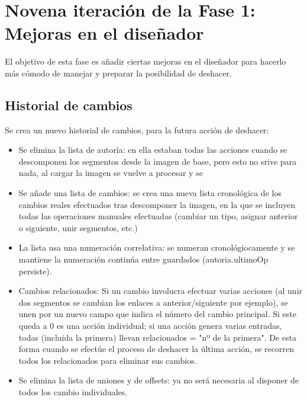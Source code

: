 	\section{Novena iteración de la Fase 1: Mejoras en el diseñador}
\label{sec:MejorasDiseñador}

El objetivo de esta fase es añadir ciertas mejoras en el diseñador para hacerlo más cómodo de manejar y preparar la posibilidad de deshacer.

\subsection{Historial de cambios}

Se crea un nuevo historial de cambios, para la futura acción de deshacer:
\begin{itemize}
	\item Se elimina la lista de autoría: en ella estaban todas las acciones cuando se descomponen los segmentos desde la imagen de base, pero esto no srive para nada, al cargar la imagen se vuelve a procesar y se 
	
	\item Se añade una lista de cambios: se crea una nueva lista cronológica de los cambios reales efectuados tras descomponer la imagen, en la que se incluyen todas las operaciones manuales efectuadas (cambiar un tipo, asignar anterior o siguiente, unir segmentos, etc.)
	
	\item La lista usa una numeración correlativa: se numeran cronológiocamente y se mantiene la numeración continúa entre guardados (autoria.ultimoOp persiste).
	
	\item Cambios relacionados: Si un cambio involucra efectuar varias acciones (al unir dos segmentos se cambian los enlaces a anterior/siguiente por ejemplo), se unen por un nuevo campo que indica el número del cambio principal. Si este queda a 0 es una acción individual; si una acción genera varias entradas, todas (incluida la primera) llevan relacionados = "nº de la primera". De esta forma cuando se efectúe el proceso de deshacer la última acción, se recorren todos los relacionados para eliminar sus cambios.
	
	\item Se elimina la lista de uniones y de offsets: ya no será necesaria al disponer de todos los cambio individuales.
	
\end{itemize}


